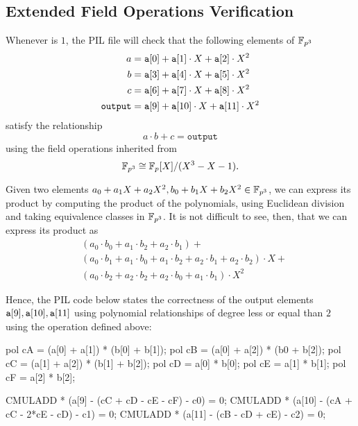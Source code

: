 \subsection{Extended Field Operations Verification} \label{sec:c12-cmuladd}

Whenever \CMULADD is $1$, the PIL file will check that the following elements of $\mathbb{F}_{p^3}$
\begin{align*}
a &= \texttt{a}[0] + \texttt{a}[1] \cdot X + \texttt{a}[2] \cdot X^2 \\
b &= \texttt{a}[3] + \texttt{a}[4] \cdot X + \texttt{a}[5] \cdot X^2 \\
c &= \texttt{a}[6] + \texttt{a}[7] \cdot X + \texttt{a}[8] \cdot X^2 \\
\texttt{output} &= \texttt{a}[9] + \texttt{a}[10] \cdot X + \texttt{a}[11] \cdot X^2
\end{align*}
satisfy the relationship
\[
a \cdot b + c = \texttt{output}
\]
using the field operations inherited from 
\[
\mathbb{F}_{p^3} \cong \mathbb{F}_p[X]/(X^3 - X - 1).
\]

Given two elements $a_0 + a_1 X + a_2 X^2, b_0 + b_1 X + b_2 X^2 \in \mathbb{F}_{p^3}$, we can express its product by computing the product of the polynomials, using Euclidean division and taking equivalence classes in $\mathbb{F}_{p^3}$. It is not difficult to see, then, that we can express its product as
\begin{align*}
&(a_0 \cdot b_0 + a_1 \cdot b_2 + a_2 \cdot b_1) + \\
&(a_0 \cdot b_1 + a_1 \cdot b_0 + a_1 \cdot b_2 + a_2 \cdot b_1 + a_2 \cdot b_2) \cdot X + \\ 
&(a_0 \cdot b_2 + a_2 \cdot b_2 + a_2 \cdot b_0 + a_1 \cdot b_1) \cdot X^2
\end{align*}

Hence, the PIL code below states the correctness of the output elements $\texttt{a}[9], \texttt{a}[10], \texttt{a}[11]$ using polynomial relationships of degree less or equal than $2$ using the operation defined above:

\begin{pil}
pol cA = (a[0] + a[1]) * (b[0] + b[1]); 
pol cB = (a[0] + a[2]) * (b0 + b[2]);
pol cC = (a[1] + a[2]) * (b[1] + b[2]);
pol cD = a[0] * b[0];
pol cE = a[1] * b[1];
pol cF = a[2] * b[2];

CMULADD * (a[9] - (cC + cD - cE - cF) - c0) = 0;
CMULADD * (a[10] - (cA + cC - 2*cE - cD) - c1) = 0;
CMULADD * (a[11] - (cB - cD + cE) - c2) = 0;
\end{pil}

